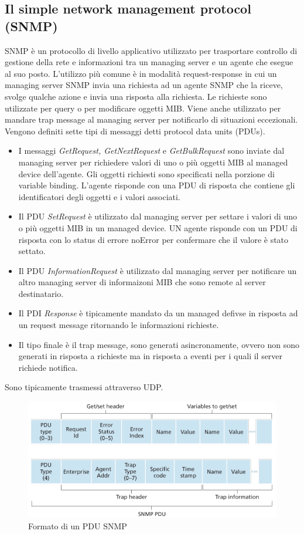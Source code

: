 \subsection{Il simple network management protocol (SNMP)}
SNMP \`e un protocollo di livello applicativo utilizzato per trasportare controllo di gestione della rete e informazioni  tra un managing server e un agente che esegue al suo posto. L'utilizzo pi\`u comune \`e in
modalit\`a request-response in cui un managing server SNMP invia una richiesta ad un agente SNMP che la riceve, svolge qualche azione e invia una risposta alla richiesta. Le richieste sono utilizzate per query o 
per modificare oggetti MIB. Viene anche utilizzato per mandare trap message al managing server per notificarlo di situazioni eccezionali. Vengono definiti sette tipi di messaggi detti protocol data units (PDUs).
\begin{itemize}
\item I messaggi \emph{GetRequest, GetNextRequest} e \emph{GetBulkRequest} sono inviate dal managing server per richiedere valori di uno o pi\`u oggetti MIB al managed device dell'agente. Gli oggetti 
richiesti sono specificati nella porzione di variable binding. L'agente risponde con una PDU di risposta che contiene gli identificatori degli oggetti e i valori associati.
\item Il PDU \emph{SetRequest} \`e utilizzato dal managing server per settare i valori di uno o pi\`u oggetti MIB in un managed device. UN agente risponde con un PDU di risposta con lo status di errore
noError per confermare che il valore \`e stato settato. 
\item Il PDU \emph{InformationRequest} \`e utilizzato dal managing server per notificare un altro managing server di informaizoni MIB che sono remote al server destinatario.
\item Il PDI \emph{Response} \`e tipicamente mandato da un managed defivse in risposta ad un request message ritornando le informazioni richieste.
\item Il tipo finale \`e il trap message, sono generati asincronamente, ovvero non sono generati in risposta a richieste ma in risposta a eventi per i quali il server richiede notifica. 
\end{itemize}
Sono tipicamente trasmessi attraverso UDP.
\begin{figure}[h]
\includegraphics[width=\textwidth]{SNMPPDUFormato.png}
\caption{Formato di un PDU SNMP}
\end{figure}